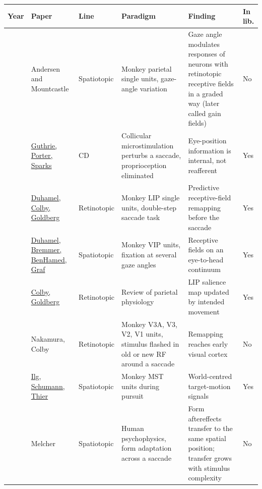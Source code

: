\documentclass[11pt,a4paper]{article}
\begin{document}
{\footnotesize\setlength{\tabcolsep}{3pt}
\begin{longtable}{>{\raggedright\arraybackslash}p{0.83cm}>{\raggedright\arraybackslash}p{3.31cm}>{\raggedright\arraybackslash}p{1.75cm}>{\raggedright\arraybackslash}p{3.77cm}>{\raggedright\arraybackslash}p{3.68cm}>{\raggedright\arraybackslash}p{1.10cm}}
\toprule
\textbf{Year} & \textbf{Paper} & \textbf{Line} & \textbf{Paradigm} & \textbf{Finding} & \textbf{In lib.} \\
\midrule
\endhead
1983 & Andersen and Mountcastle & Spatiotopic & Monkey parietal single units, gaze-angle variation & Gaze angle modulates responses of neurons with retinotopic receptive fields in a graded way (later called gain fields) & No \\
\addlinespace[2pt]
1983 & \href{https://www.jstor.org/stable/1690996}{Guthrie, Porter, Sparks} & CD & Collicular microstimulation perturbs a saccade, proprioception eliminated & Eye-position information is internal, not reafferent & Yes \\
\addlinespace[2pt]
1992 & \href{https://www.science.org/doi/10.1126/science.1553535}{Duhamel, Colby, Goldberg} & Retinotopic & Monkey LIP single units, double-step saccade task & Predictive receptive-field remapping before the saccade & Yes \\
\addlinespace[2pt]
1997 & \href{https://www.nature.com/articles/39865}{Duhamel, Bremmer, BenHamed, Graf} & Spatiotopic & Monkey VIP units, fixation at several gaze angles & Receptive fields on an eye-to-head continuum & Yes \\
\addlinespace[2pt]
1999 & \href{https://www.annualreviews.org/doi/10.1146/annurev.neuro.22.1.319}{Colby, Goldberg} & Retinotopic & Review of parietal physiology & LIP salience map updated by intended movement & Yes \\
\addlinespace[2pt]
2002 & Nakamura, Colby & Retinotopic & Monkey V3A, V3, V2, V1 units, stimulus flashed in old or new RF around a saccade & Remapping reaches early visual cortex & No \\
\addlinespace[2pt]
2004 & \href{https://www.sciencedirect.com/science/article/pii/S0896627304003319}{Ilg, Schumann, Thier} & Spatiotopic & Monkey MST units during pursuit & World-centred target-motion signals & Yes \\
\addlinespace[2pt]
2005 & Melcher & Spatiotopic & Human psychophysics, form adaptation across a saccade & Form aftereffects transfer to the same spatial position; transfer grows with stimulus complexity & No \\

\end{longtable}}
\end{document}
